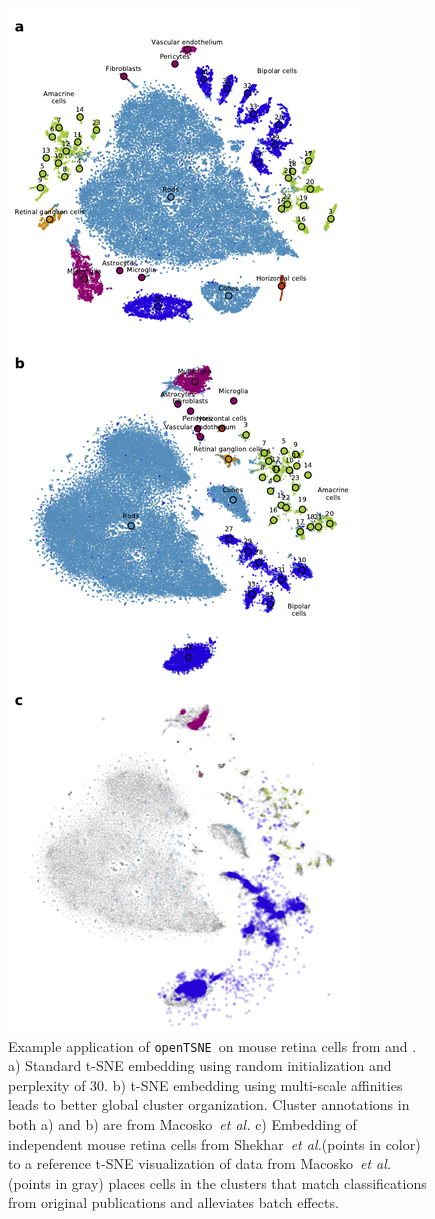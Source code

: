 \documentclass{bioinfo}
\def\etal{{\em et al.}\xspace}
\newcommand{\opentsne}[0]{{\tt openTSNE}\ }
\begin{document}
\begin{figure}[htbp]
\centerline{\includegraphics[width=0.7\linewidth]{policar-fig-1}}
\caption{Example application of \opentsne on mouse retina cells from
\citet{Macosko2015} and \citet{Shekhar2016}. a) Standard t-SNE embedding using
random initialization and perplexity of 30. b) t-SNE embedding using
multi-scale affinities leads to better global cluster organization. Cluster
annotations in both a) and b) are from Macosko~\etal c) Embedding of independent mouse retina cells from
Shekhar~\etal (points in color) to a reference t-SNE visualization of data from
Macosko~\etal (points in gray) places cells in the clusters that match
classifications from original publications and alleviates batch effects.}
\label{fig:tsne}
\end{figure}
\end{document}
